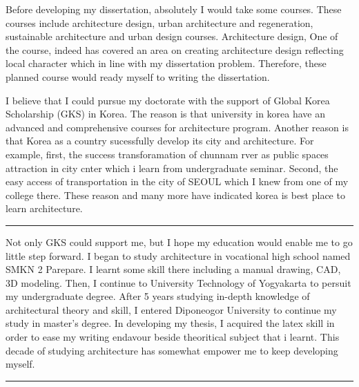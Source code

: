 \documentclass[11pt]{simart} %
\begin{document}
Before developing my dissertation, absolutely I would take some courses. These courses include architecture design, urban architecture and regeneration, sustainable architecture and urban design courses.
Architecture design, One of the course, indeed has covered an area on creating architecture design reflecting local character which in line with my dissertation problem. Therefore, these planned course would ready myself to writing the dissertation.

I believe that I could pursue my doctorate with the support of Global Korea Scholarship (GKS) in Korea. The reason is that university in korea have an advanced and comprehensive courses for architecture program. Another reason is that Korea as a country sucessfully develop its city and architecture.
For example, first, the success  transforamation of chunnam rver as public spaces attraction in city cnter which i learn from  undergraduate seminar.
Second, the easy access of transportation in the city of SEOUL which I knew from one of my college there. These reason and many more have indicated korea is best place to learn architecture.

\noindent\rule{\linewidth}{0.5pt}

Not only GKS could support me, but I hope my education would enable me to go little step forward. I began to study architecture in vocational high school named SMKN 2 Parepare. I learnt some skill there including a manual drawing, CAD, 3D modeling. Then, I continue to University Technology of Yogyakarta to persuit my undergraduate degree. After 5 years studying in-depth knowledge of architectural theory and skill, I entered Diponeogor University to continue my study in master's degree. In developing my thesis, I acquired the latex skill in order to ease my writing endavour beside theoritical subject that i learnt.
This decade of studying architecture has somewhat empower me to keep developing myself.


\noindent\rule{\linewidth}{0.5pt}
\end{document}
